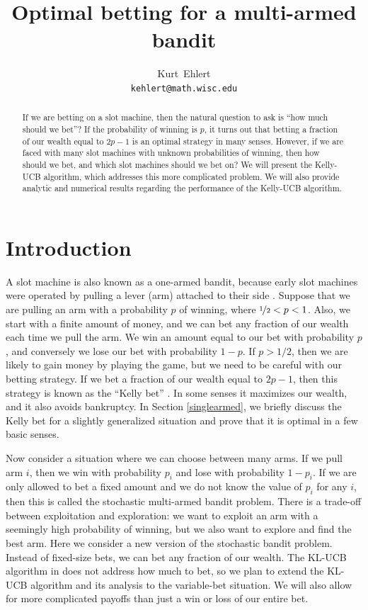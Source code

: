 \documentclass[letterpaper]{article}
\title{Optimal betting for a multi-armed bandit}
\author{
  Kurt~Ehlert\\
  \texttt{kehlert@math.wisc.edu}\\
}
\numberwithin{equation}{section}
\theoremstyle{plain}
\begin{document}

\maketitle

\begin{abstract}
If we are betting on a slot machine, then the natural question to ask is ``how much should we bet''? If the probability of winning is $p$, it turns out that betting a fraction of our wealth equal to $2p-1$ is an optimal strategy in many senses. However, if we are faced with many slot machines with unknown probabilities of winning, then how should we bet, and which slot machines should we bet on? We will present the Kelly-UCB algorithm, which addresses this more complicated problem. We will also provide analytic and numerical results regarding the performance of the Kelly-UCB algorithm.
\end{abstract}

\section{Introduction}
A slot machine is also known as a one-armed bandit, because early slot machines were operated by pulling a lever (arm) attached to their side \citep{onearmedbanditdict}. Suppose that we are pulling an arm with a probability $p$ of winning, where $\nicefrac{1}{2} < p < 1$. Also, we start with a finite amount of money, and we can bet any fraction of our wealth each time we pull the arm. We win an amount equal to our bet with probability $p$, and conversely we lose our bet with probability $1-p$. If $p > 1/2$, then we are likely to gain money by playing the game, but we need to be careful with our betting strategy. If we bet a fraction of our wealth equal to $2p-1$, then this strategy is known as the ``Kelly bet'' \citep{kelly1956new,thorp2006kelly}. In some senses it maximizes our wealth, and it also avoids bankruptcy. In Section \ref{singlearmed}, we briefly discuss the Kelly bet for a slightly generalized situation and prove that it is optimal in a few basic senses.

Now consider a situation where we can choose between many arms. If we pull arm $i$, then we win with probability $p_i$ and lose with probability $1-p_i$. If we are only allowed to bet a fixed amount and we do not know the value of $p_i$ for any $i$, then this is called the stochastic multi-armed bandit problem. There is a trade-off between exploitation and exploration: we want to exploit an arm with a seemingly high probability of winning, but we also want to explore and find the best arm. Here we consider a new version of the stochastic bandit problem. Instead of fixed-size bets, we can bet any fraction of our wealth. The KL-UCB algorithm in \cite{cappe2013kullback} does not address how much to bet, so we plan to extend the KL-UCB algorithm and its analysis to the variable-bet situation. We will also allow for more complicated payoffs than just a win or loss of our entire bet.
\end{document}
